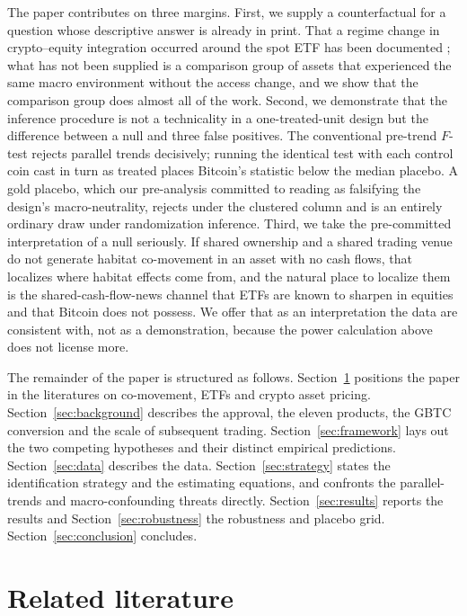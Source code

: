 \documentclass[12pt,a4paper]{article}
\begin{document}
The paper contributes on three margins. First, we supply a counterfactual for a question whose descriptive answer is already in print. That a regime change in crypto--equity integration occurred around the spot ETF has been documented \citep{khatib2026from}; what has not been supplied is a comparison group of assets that experienced the same macro environment without the access change, and we show that the comparison group does almost all of the work. Second, we demonstrate that the inference procedure is not a technicality in a one-treated-unit design but the difference between a null and three false positives. The conventional pre-trend $F$-test rejects parallel trends decisively; running the identical test with each control coin cast in turn as treated places Bitcoin's statistic below the median placebo. A gold placebo, which our pre-analysis committed to reading as falsifying the design's macro-neutrality, rejects under the clustered column and is an entirely ordinary draw under randomization inference. Third, we take the pre-committed interpretation of a null seriously. If shared ownership and a shared trading venue do not generate habitat co-movement in an asset with no cash flows, that localizes where habitat effects come from, and the natural place to localize them is the shared-cash-flow-news channel that ETFs are known to sharpen in equities \citep{glosten2020etf,israeli2017is} and that Bitcoin does not possess. We offer that as an interpretation the data are consistent with, not as a demonstration, because the power calculation above does not license more.

The remainder of the paper is structured as follows. Section~\ref{sec:lit} positions the paper in the literatures on co-movement, ETFs and crypto asset pricing. Section~\ref{sec:background} describes the approval, the eleven products, the GBTC conversion and the scale of subsequent trading. Section~\ref{sec:framework} lays out the two competing hypotheses and their distinct empirical predictions. Section~\ref{sec:data} describes the data. Section~\ref{sec:strategy} states the identification strategy and the estimating equations, and confronts the parallel-trends and macro-confounding threats directly. Section~\ref{sec:results} reports the results and Section~\ref{sec:robustness} the robustness and placebo grid. Section~\ref{sec:conclusion} concludes.

\section{Related literature}\label{sec:lit}
\end{document}
